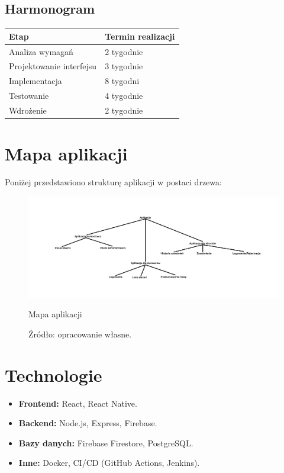 \subsection{Harmonogram}
\begin{tabular}{|l|l|}
    \hline
    \textbf{Etap} & \textbf{Termin realizacji} \\
    \hline
    Analiza wymagań & 2 tygodnie \\
    \hline
    Projektowanie interfejsu & 3 tygodnie \\
    \hline
    Implementacja & 8 tygodni \\
    \hline
    Testowanie & 4 tygodnie \\
    \hline
    Wdrożenie & 2 tygodnie \\
    \hline
\end{tabular}

\section{Mapa aplikacji}
Poniżej przedstawiono strukturę aplikacji w postaci drzewa:
\begin{figure}
	\centering
	\includegraphics[width=150mm]{images/tree.jpg}
	\caption{Mapa aplikacji}
	\caption*{Źródło: opracowanie własne.}
    \label{fig:tree}
\end{figure}

\newpage

\section{Technologie}
\begin{itemize}
    \item \textbf{Frontend:} React, React Native.
    \item \textbf{Backend:} Node.js, Express, Firebase.
    \item \textbf{Bazy danych:} Firebase Firestore, PostgreSQL.
    \item \textbf{Inne:} Docker, CI/CD (GitHub Actions, Jenkins).
\end{itemize}

